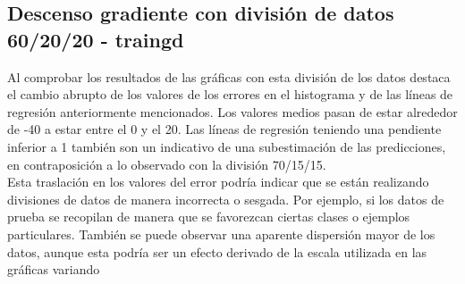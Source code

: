 \documentclass[a4paper, 12pt]{article}
\begin{document}
            \subsection{Descenso gradiente con división de datos 60/20/20 - traingd}
                Al comprobar los resultados de las gráficas con esta división de los datos destaca el cambio abrupto de los valores de los errores en el histograma y de las líneas de regresión anteriormente mencionados. Los valores medios pasan de estar alrededor de -40 a estar entre el 0 y el 20. Las líneas de regresión teniendo una pendiente inferior a 1 también son un indicativo de una subestimación de las predicciones, en contraposición a lo observado con la división 70/15/15.\\ Esta traslación en los valores del error podría indicar que se están realizando divisiones de datos de manera incorrecta o sesgada. Por ejemplo, si los datos de prueba se recopilan de manera que se favorezcan ciertas clases o ejemplos particulares. También se puede observar una aparente dispersión mayor de los datos, aunque esta podría ser un efecto derivado de la escala utilizada en las gráficas variando
\end{document}
